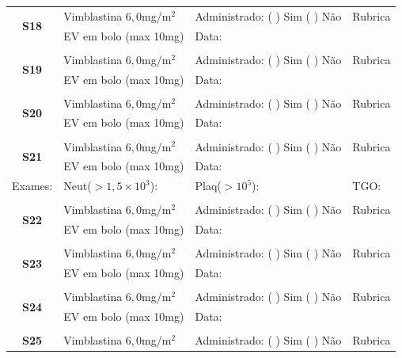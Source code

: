 \documentclass[11pt,a4paper,oldfontcommands]{memoir}
\begin{document}
\begin{center}
\begin{table}[H]
\begin{tabular}{p{}p{}|p{}|p{3cm}}
    \hline
    \multicolumn{1}{c|}{\multirow{2}{*}{\textbf{S18}}}&{Vimblastina \(6,0\)mg/m\(^2\)}&{Administrado: (  ) Sim (  ) Não}&{Rubrica}\\
    \multicolumn{1}{c|}{}&{EV em bolo (max 10mg)}&{Data:}&\\
    \hline\\
    \hline
    \multicolumn{1}{c|}{\multirow{2}{*}{\textbf{S19}}}&{Vimblastina \(6,0\)mg/m\(^2\)}&{Administrado: (  ) Sim (  ) Não}&{Rubrica}\\
    \multicolumn{1}{c|}{}&{EV em bolo (max 10mg)}&{Data:}&\\
    \hline
    \\
    \hline
    \multicolumn{1}{c|}{\multirow{2}{*}{\textbf{S20}}}&{Vimblastina \(6,0\)mg/m\(^2\)}&{Administrado: (  ) Sim (  ) Não}&{Rubrica}\\
    \multicolumn{1}{c|}{}&{EV em bolo (max 10mg)}&{Data:}&\\
    \hline
    \\
    \hline
    \multicolumn{1}{c|}{\multirow{2}{*}{\textbf{S21}}}&{Vimblastina \(6,0\)mg/m\(^2\)}&{Administrado: (  ) Sim (  ) Não}&{Rubrica}\\
    \multicolumn{1}{c|}{}&{EV em bolo (max 10mg)}&{Data:}&\\
    \hline
    {Exames:}&{Neut(\(>1,5\times10^3\)):}&{Plaq(\(>10^5\)):}&{TGO:}
    \\
    \hline
    \\
    \hline
    \multicolumn{1}{c|}{\multirow{2}{*}{\textbf{S22}}}&{Vimblastina \(6,0\)mg/m\(^2\)}&{Administrado: (  ) Sim (  ) Não}&{Rubrica}\\
    \multicolumn{1}{c|}{}&{EV em bolo (max 10mg)}&{Data:}&\\
    \hline
    \\
    \hline
    \multicolumn{1}{c|}{\multirow{2}{*}{\textbf{S23}}}&{Vimblastina \(6,0\)mg/m\(^2\)}&{Administrado: (  ) Sim (  ) Não}&{Rubrica}\\
    \multicolumn{1}{c|}{}&{EV em bolo (max 10mg)}&{Data:}&\\
    \hline
    \\
    \hline
    \multicolumn{1}{c|}{\multirow{2}{*}{\textbf{S24}}}&{Vimblastina \(6,0\)mg/m\(^2\)}&{Administrado: (  ) Sim (  ) Não}&{Rubrica}\\
    \multicolumn{1}{c|}{}&{EV em bolo (max 10mg)}&{Data:}&\\
    \hline
    \\
    \hline
    \multicolumn{1}{c|}{\multirow{2}{*}{\textbf{S25}}}&{Vimblastina \(6,0\)mg/m\(^2\)}&{Administrado: (  ) Sim (  ) Não}&{Rubrica}\\

\end{tabular}
\end{table}
\end{center}
\end{document}
